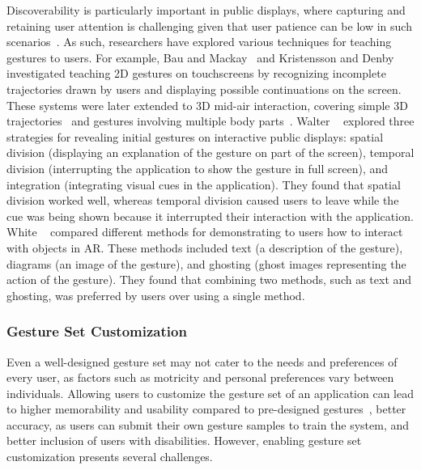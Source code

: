 Discoverability is particularly important in public displays, where capturing and retaining user attention is challenging given that user patience can be low in such scenarios~\cite{Walter:2013}.
%
As such, researchers have explored various techniques for teaching gestures to users.
%
For example, Bau and Mackay~\cite{Bau:2008} and Kristensson and Denby~\cite{Kristensson:2011} investigated teaching 2D gestures on touchscreens by recognizing incomplete trajectories drawn by users and displaying possible continuations on the screen.
%
These systems were later extended to 3D mid-air interaction, covering simple 3D trajectories~\cite{Fennedy:2021} and gestures involving multiple body parts~\cite{Rovelo:2015, Alt:2018}. 
%
Walter \etal~\cite{Walter:2013} explored three strategies for revealing initial gestures on interactive public displays: spatial division (\ie displaying an explanation of the gesture on part of the screen), temporal division (interrupting the application to show the gesture in full screen), and integration (integrating visual cues in the application). They found that spatial division worked well, whereas temporal division caused users to leave while the cue was being shown because it interrupted their interaction with the application.
%
White \etal~\cite{White:2007} compared different methods for demonstrating to users how to interact with objects in AR. These methods included text (\ie a description of the gesture), diagrams (\ie an image of the gesture), and ghosting (\ie ghost images representing the action of the gesture). They found that combining two methods, such as text and ghosting, was preferred by users over using a single method.


\subsubsection{Gesture Set Customization}
Even a well-designed gesture set may not cater to the needs and preferences of every user, as factors such as motricity and personal preferences vary between individuals. Allowing users to customize the gesture set of an application can lead to higher memorability and usability compared to pre-designed gestures~\cite{Oh:2013,Nacenta:2013}, better accuracy, as users can submit their own gesture samples to train the system, and better inclusion of users with disabilities.
% 
However, enabling gesture set customization presents several challenges.

